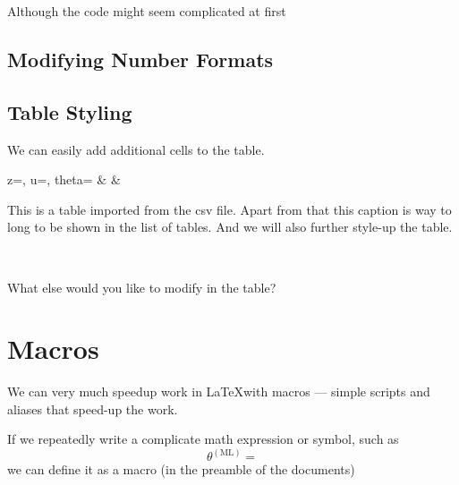 \documentclass[a4paper,10pt]{report} %
\begin{document}
Although the code might seem complicated at first 

\subsection{Modifying Number Formats}

\newpage 
\subsection{Table Styling}

  We can easily add additional cells to the table.
  
  \begin{table}[h!] \label{tab:styled}
  \begin{center}
  {  z=\zvec, u=\uvec, theta=\thvec    %
  }{%
     \zvec  & \uvec & \thvec        %
  } %
  \caption[short table description]{This is a table imported from the csv file. Apart from that this caption is way to long to be shown in the list of tables. And we will also further style-up the table. }
  \end{center}
\end{table} ~\vspace{1ex}
  
  What else would you like to modify in the table?


\section{Macros}
We can very much speedup work in \LaTeX with macros --- simple scripts and aliases that speed-up the work.

If we repeatedly write a complicate math expression or symbol, such as
\[ \theta^{\scriptscriptstyle \mathrm{(ML)}} =  \]
we can define  it as a macro (in the preamble of the documents)
\end{document}
